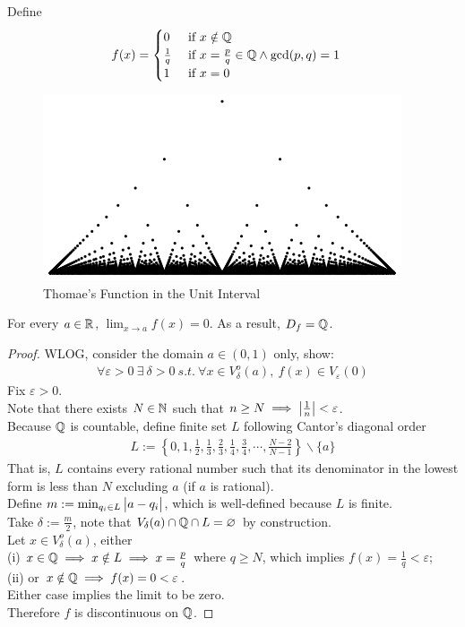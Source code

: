 \documentclass[11pt]{article}
\begin{document}
	\begin{example}
		Define
		\begin{align}
			f(x) &= \begin{cases}
				0 &\text{{ if }} x \notin \mathbb{Q}\\
				\frac{1}{q} &\text{{ if }} x = \frac{p}{q} \in \mathbb{Q} \land \text{{gcd}}(p, q) = 1 \\
				1 &\text{{ if }} x = 0
			\end{cases}
		\end{align}
		\begin{figure}[H]
			\centering
			\includegraphics[width=0.5\linewidth]{figure/thomae_function.png}
			\caption{Thomae's Function in the Unit Interval}
		\end{figure}
	\end{example}
	\begin{proposition}
		For every $a \in \mathbb{R}$, $\lim_{x \to a} f(x) = 0$. As a result, $D_f = \mathbb{Q}$.
		\begin{proof}
			WLOG, consider the domain $a \in (0, 1)$ only, show:
			\begin{align}
				\forall \varepsilon > 0\ \exists\ \delta > 0\ s.t.\ \forall x \in V_\delta^o(a),\ f(x) \in V_\varepsilon(0)
			\end{align}
			Fix $\varepsilon > 0$. \\
			Note that there exists $N \in \mathbb{N}$ such that $n \geq N \implies \big \vert {\frac{1}{n}} \big \vert < \varepsilon$.\\
			Because $\mathbb{Q}$ is countable, define finite set $L$ following Cantor's diagonal order
			\begin{align}
				L := \left\{
				0, 1, \frac{1}{2},  \frac{1}{3}, \frac{2}{3}, \frac{1}{4}, \frac{3}{4}, \cdots,
				\frac{N-2}{N-1}
				\right \} \backslash \{ a \}
			\end{align}
			That is, $L$ contains every rational number such that its denominator in the lowest form is less than $N$ excluding $a$ (if $a$ is rational). \\
			Define $m := \min_{q_i \in L} \big \vert {a - q_i} \big \vert$, which is well-defined because $L$ is finite. \\
			Take $\delta := \frac{m}{2}$, note that $V_\delta (a) \cap \mathbb{Q} \cap L = \varnothing$ by construction. \\
			Let $x \in V_\delta^o(a)$, either \\
			(i) $x \in \mathbb{Q} \implies x \notin L \implies x = \frac{p}{q}$ where $q \geq N$, which implies $f(x) = \frac{1}{q} < \varepsilon$; \\
			(ii) or $x \notin \mathbb{Q} \implies f(x) = 0 < \varepsilon$. \\
			Either case implies the limit to be zero. \\
			Therefore $f$ is discontinuous on $\mathbb{Q}$.
		\end{proof}
	\end{proposition}
	
\end{document}
